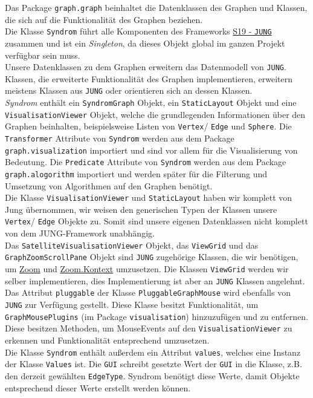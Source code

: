 \documentclass[enabledeprecatedfontcommands,fontsize=11pt,paper=a4,twoside]{scrartcl}
\newcounter{one}
\begin{document}
Das Package \texttt{graph.graph} beinhaltet die Datenklassen des Graphen und Klassen, die sich auf die Funktionalität des Graphen beziehen. \\
Die Klasse \texttt{Syndrom} führt alle Komponenten des Frameworks \hyperlink{eee}{S19 - \texttt{JUNG}} zusammen und ist ein \textit{Singleton}, da dieses Objekt global im ganzen Projekt verfügbar sein muss. \\
Unsere Datenklassen zu dem Graphen erweitern das Datenmodell von \texttt{JUNG}. Klassen, die erweiterte Funktionalität des Graphen implementieren, erweitern meistens Klassen aus \texttt{JUNG} oder orientieren sich an dessen Klassen. \\
\textit{Syndrom} enthält ein \texttt{SyndromGraph} Objekt, ein \texttt{StaticLayout} Objekt und eine \texttt{VisualisationViewer} Objekt, welche die grundlegenden Informationen über den Graphen beinhalten, beispielsweise Listen von \texttt{Vertex}/ \texttt{Edge} und \texttt{Sphere}. Die \texttt{Transformer} Attribute von \texttt{Syndrom} werden aus dem Package \texttt{graph.visualization} importiert und sind vor allem für die Visualisierung von Bedeutung. Die \texttt{Predicate} Attribute von \texttt{Syndrom} werden aus dem Package \texttt{graph.alogorithm} importiert und werden später für die Filterung und Umsetzung von Algorithmen auf den Graphen benötigt. \\
Die Klasse  \texttt{VisualisationViewer} und \texttt{StaticLayout} haben wir komplett von Jung übernommen, wir weisen den generischen Typen der Klassen unsere \texttt{Vertex}/ \texttt{Edge} Objekte zu. Somit sind unsere eigenen Datenklassen nicht  komplett von dem JUNG-Framework unabhängig.\\
Das \texttt{SatelliteVisualisationViewer} Objekt, das \texttt{ViewGrid} und das \texttt{GraphZoomScrollPane} Objekt sind \texttt{JUNG} zugehörige Klassen, die wir benötigen, um \hyperlink{dd}{Zoom} und \hyperlink{ff}{Zoom.Kontext} umzusetzen. Die Klassen \texttt{ViewGrid} werden wir selber implementieren, dies Implementierung ist aber an \texttt{JUNG} Klassen angelehnt.\\
Das Attribut \texttt{pluggable} der Klasse \texttt{PluggableGraphMouse} wird ebenfalls von \texttt{JUNG} zur Verfügung gestellt. Diese Klasse besitzt Funktionalität, um \texttt{GraphMousePlugins} (im Package \texttt{visualisation}) hinzuzufügen und zu entfernen. Diese besitzen Methoden, um MouseEvents auf den \texttt{VisualisationViewer} zu erkennen und Funktionalität entsprechend umzusetzen. \\
Die Klasse \texttt{Syndrom} enthält außerdem ein Attribut \texttt{values}, welches eine Instanz der Klasse \texttt{Values} ist. Die \texttt{GUI} schreibt gesetzte Wert der \texttt{GUI} in die Klasse, z.B. den derzeit gewählten \texttt{EdgeType}. Syndrom benötigt diese Werte, damit Objekte entsprechend dieser Werte erstellt werden können. \\

\end{document}
